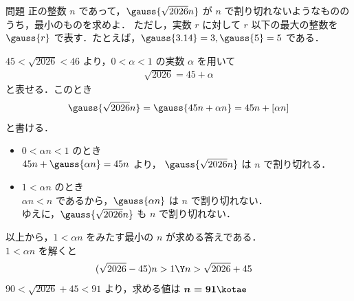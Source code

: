 \documentclass[fleqn]{ltjsarticle}
\begin{document}

\begin{problembox}{問題}
  正の整数 $n$ であって，$\gauss{\sqrt{2026}n}$ が $n$ で割り切れないようなもののうち，最小のものを求めよ．
  ただし，実数 $r$ に対して $r$ 以下の最大の整数を $\gauss{r}$ で表す．たとえば，$\gauss{3.14}=3, \gauss{5}=5$ である．

\end{problembox}

\noindent
\kaib\quad
$45<\sqrt{2026}<46$ より，$0<\alpha<1$ の実数 $\alpha$ を用いて
\begin{align*}
  \sqrt{2026}=45+\alpha
\end{align*}
と表せる．このとき
\begin{align*}
  \gauss{\sqrt{2026}n}=\gauss{45n+\alpha n}=45n+[\alpha n]
\end{align*}
と書ける．
\begin{itemize}
  \item [] $0<\alpha n<1$ のとき \\
    $45n+\gauss{\alpha n}=45n$ より，
    $\gauss{\sqrt{2026}n}$ は $n$ で割り切れる．
  \item [] $1<\alpha n$ のとき \\
    $\alpha n<n$ であるから，$\gauss{\alpha n}$ は $n$ で割り切れない． \\
    ゆえに，$\gauss{\sqrt{2026}n}$ も $n$ で割り切れない．
\end{itemize}
以上から，$1<\alpha n$ をみたす最小の $n$ が求める答えである． \\
$1<\alpha n$ を解くと
\begin{align*}
  &(\sqrt{2026}-45)n>1 \Y n>\sqrt{2026}+45
\end{align*}
$90<\sqrt{2026}+45<91$ より，求める値は $\boldsymbol{n=91}\kotae$

\end{document}

